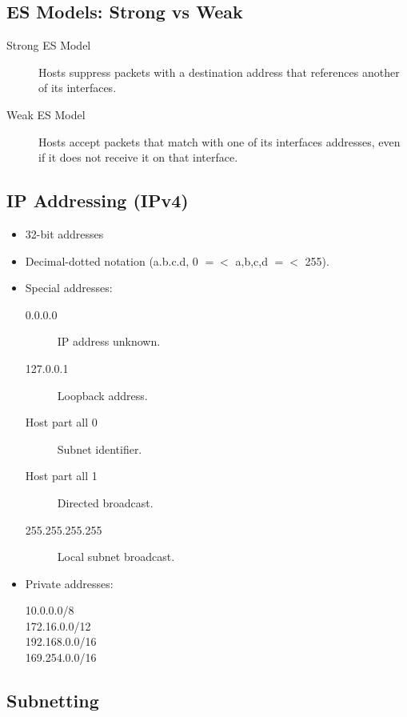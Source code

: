 \documentclass{article}
\begin{document}
\subsection{ES Models: Strong vs Weak}

\begin{description}
	\item[Strong ES Model] Hosts suppress packets with a destination address that references another of its interfaces.
	\item[Weak ES Model] Hosts accept packets that match with one of its interfaces addresses, even if it does not receive it on that interface.
\end{description}


\subsection{IP Addressing (IPv4)}

\begin{itemize}
	\item 32-bit addresses
	\item Decimal-dotted notation (a.b.c.d, 0 $=<$ a,b,c,d $=<$ 255).
	\item Special addresses:
	\begin{description}
		\item[0.0.0.0] IP address unknown.
		\item[127.0.0.1] Loopback address.
		\item[Host part all 0] Subnet identifier.
		\item[Host part all 1] Directed broadcast.
		\item[255.255.255.255] Local subnet broadcast.
	\end{description}
	\item Private addresses:
	\begin{description}
		\item[10.0.0.0/8] 
		\item[172.16.0.0/12]
		\item[192.168.0.0/16]
		\item[169.254.0.0/16]
	\end{description}
\end{itemize}


\subsection{Subnetting}
\end{document}
